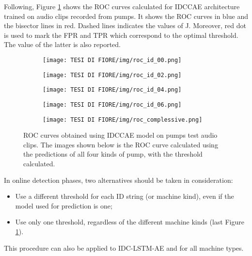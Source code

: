 Following, Figure \ref{roc_curves} shows the ROC curves calculated for IDCCAE architecture trained on audio clips recorded from pumps. It shows the ROC curves in blue and the bisector lines in red. Dashed lines indicates the values of J. Moreover, red dot is used to mark the FPR and TPR which correspond to the optimal threshold. The value of the latter is also reported.
\begin{figure}[ht]
\centering
\begin{subfigure}
    \centering
    \texttt{[image: TESI DI FIORE/img/roc\_id\_00.png]}
\end{subfigure}
\begin{subfigure}
    \centering
    \texttt{[image: TESI DI FIORE/img/roc\_id\_02.png]}
\end{subfigure}
\begin{subfigure}
    \centering
    \texttt{[image: TESI DI FIORE/img/roc\_id\_04.png]}
\end{subfigure}
\begin{subfigure}
    \centering
    \texttt{[image: TESI DI FIORE/img/roc\_id\_06.png]}
\end{subfigure}
\begin{subfigure}
    \centering
    \texttt{[image: TESI DI FIORE/img/roc\_complessive.png]}
\end{subfigure}
\caption{ ROC curves obtained using IDCCAE model on pumps test audio clips. The images shown below is the ROC curve calculated using the predictions of all four kinds of pump, with the threshold calculated.}
\label{roc_curves}
\end{figure}
In online detection phases, two alternatives should be taken in consideration:
\begin{itemize}
    \item {Use a different threshold for each ID string (or machine kind), even if the model used for prediction is one;}
    \item {Use only one threshold, regardless of the different machine kinds (last Figure \ref{roc_curves}).}
\end{itemize}
This procedure can also be applied to IDC-LSTM-AE and for all machine types.